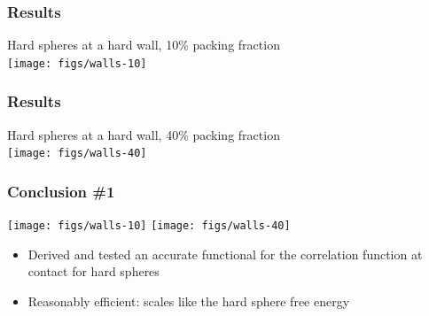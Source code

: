 \begin{frame}
  \frametitle{Results}
  \begin{center}
    Hard spheres at a hard wall, 10\% packing fraction\\
    \texttt{[image: figs/walls-10]}
  \end{center}
\end{frame}

\begin{frame}
  \frametitle{Results}
  \begin{center}
    Hard spheres at a hard wall, 40\% packing fraction\\
    \texttt{[image: figs/walls-40]}
  \end{center}
\end{frame}

\begin{frame}
  \frametitle{Conclusion \#1}
  \begin{center}
    \texttt{[image: figs/walls-10]}
    \texttt{[image: figs/walls-40]}
  \end{center}
  \begin{itemize}
  \item Derived and tested an accurate functional for the correlation
    function at contact for hard spheres
  \item Reasonably efficient: scales like the hard sphere free energy
  \end{itemize}
\end{frame}
